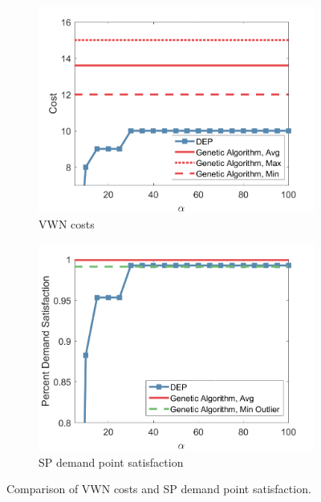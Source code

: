 \documentclass[conference]{IEEEtran}
\begin{document}
\iffalse
\begin{figure}[t]
\centering
\begin{subfigure}{.3\textwidth}
	\centering
	\includegraphics[width=1\linewidth]{Figures/ComparisonCost}
	\caption{VWN costs}
	\label{fig:VWNCompCost}
\end{subfigure}
\hspace{0.5cm}
\begin{subfigure}{.3\textwidth}
	\centering
	\includegraphics[width=1\linewidth]{Figures/ComparisonSatisfaction}
	\caption{SP demand point satisfaction}
	\label{fig:VWNCompSatis}
\end{subfigure}
\caption{\small Comparison of VWN costs and SP demand point satisfaction.}
\label{fig:VWNComp}
\end{figure}
\end{document}
